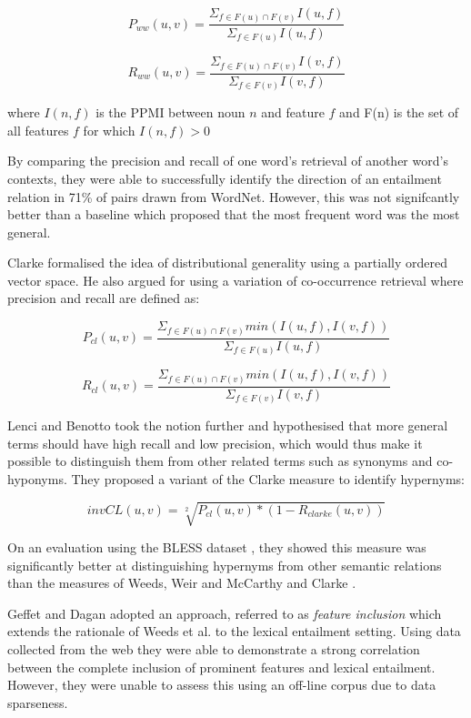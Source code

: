 \documentclass[11pt]{article}
\begin{document}
\[
P_{ww}(u,v) = \frac{\Sigma_{f \in F(u) \cap F(v)} I(u,f)}{\Sigma_{f \in F(u)} I(u,f)}
\]

\[
R_{ww}(u,v) = \frac{\Sigma_{f \in F(u) \cap F(v)} I(v,f)}{\Sigma_{f \in F(v)} I(v,f)}
\]

where $I(n,f)$ is the PPMI between noun $n$ and feature $f$ and F(n) is the set of all features $f$ for which $I(n,f)>0$

By comparing the precision and recall of one word's retrieval of another word's contexts, they were able to successfully identify the direction of an entailment relation in 71\% of pairs drawn from WordNet.  However, this was not signifcantly better than a baseline which proposed that the most frequent word was the most general.

Clarke  formalised the idea of distributional generality using a partially ordered vector space.  He also argued for using a variation of co-occurrence retrieval where precision and recall are defined as:

\[
P_{cl}(u,v) = \frac{\Sigma_{f \in F(u) \cap F(v)} min(I(u,f),I(v,f))}{\Sigma_{f \in F(u)} I(u,f)}
\]

\[
R_{cl}(u,v) = \frac{\Sigma_{f \in F(u) \cap F(v)} min(I(u,f),I(v,f))}{\Sigma_{f \in F(v)} I(v,f)}
\]

Lenci and Benotto  took the notion further and hypothesised that more general terms should have high recall and low precision, which would thus make it possible to distinguish them from other related terms such as synonyms and co-hyponyms.  They proposed a variant of the Clarke  measure to identify hypernyms:

\[
invCL(u,v) = \sqrt[2]{P_{cl}(u,v)*(1-R_{clarke}(u,v))}
\]

On an evaluation using the BLESS dataset \cite{Baroni2011}, they showed this measure was significantly better at distinguishing hypernyms from other semantic relations than the measures of Weeds, Weir and McCarthy  and Clarke .

Geffet and Dagan  adopted an approach, referred to as \emph{feature inclusion} which extends the rationale of Weeds et al. \cite{Weeds2004} to the lexical entailment setting.    Using data collected from the web they were able to demonstrate a strong correlation between the complete inclusion of prominent features and lexical entailment.  However, they were unable to assess this using an off-line corpus due to data sparseness.
\end{document}

